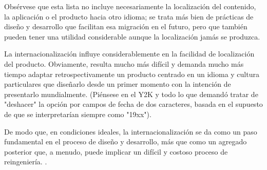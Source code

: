Obsérvese que esta lista no incluye necesariamente la localización del contenido, la aplicación o el producto hacia otro idioma; se trata más bien de prácticas de diseño y desarrollo que facilitan esa migración en el futuro, pero que también pueden tener una utilidad considerable aunque la localización jamás se produzca.

La internacionalización influye considerablemente en la facilidad de localización del producto. Obviamente, resulta mucho más difícil y demanda mucho más tiempo adaptar retrospectivamente un producto centrado en un idioma y cultura particulares que diseñarlo desde un primer momento con la intención de presentarlo mundialmente. (Piénsese en el Y2K y todo lo que demandó tratar de "deshacer" la opción por campos de fecha de dos caracteres, basada en el supuesto de que se interpretarían siempre como "19xx").

De modo que, en condiciones ideales, la internacionalización se da como un paso fundamental en el proceso de diseño y desarrollo, más que como un agregado posterior que, a menudo, puede implicar un difícil y costoso proceso de reingeniería.
.

